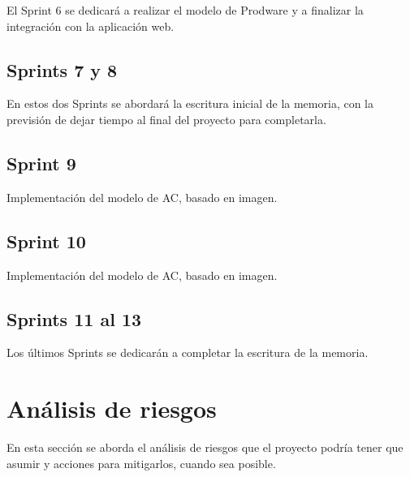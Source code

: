 El Sprint 6 se dedicará a realizar el modelo de Prodware y a finalizar la integración con la aplicación web.

\subsection{Sprints 7 y 8}

En estos dos Sprints se abordará la escritura inicial de la memoria, con la previsión de dejar tiempo al final del proyecto para completarla.

\subsection{Sprint 9}

Implementación del modelo de AC, basado en imagen.

\subsection{Sprint 10}

Implementación del modelo de AC, basado en imagen.

\subsection{Sprints 11 al 13}

Los últimos Sprints se dedicarán a completar la escritura de la memoria.

\section{Análisis de riesgos}

En esta sección se aborda el análisis de riesgos que el proyecto podría tener que asumir y acciones para mitigarlos, cuando sea posible.

